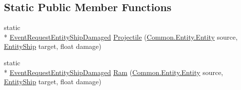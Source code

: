 \subsection*{Static Public Member Functions}
\begin{DoxyCompactItemize}
\item 
static \\*
\hyperlink{class_skyrates_1_1_client_1_1_network_1_1_event_1_1_event_request_entity_ship_damaged}{Event\-Request\-Entity\-Ship\-Damaged} \hyperlink{class_skyrates_1_1_client_1_1_network_1_1_event_1_1_event_request_entity_ship_damaged_a2349e761091c78c246224a5b129cb69c}{Projectile} (\hyperlink{class_skyrates_1_1_common_1_1_entity_1_1_entity}{Common.\-Entity.\-Entity} source, \hyperlink{class_skyrates_1_1_client_1_1_entity_1_1_entity_ship}{Entity\-Ship} target, float damage)
\item 
static \\*
\hyperlink{class_skyrates_1_1_client_1_1_network_1_1_event_1_1_event_request_entity_ship_damaged}{Event\-Request\-Entity\-Ship\-Damaged} \hyperlink{class_skyrates_1_1_client_1_1_network_1_1_event_1_1_event_request_entity_ship_damaged_abf0a860dbfeaf12e4f2165f4def0e438}{Ram} (\hyperlink{class_skyrates_1_1_common_1_1_entity_1_1_entity}{Common.\-Entity.\-Entity} source, \hyperlink{class_skyrates_1_1_client_1_1_entity_1_1_entity_ship}{Entity\-Ship} target, float damage)
\end{DoxyCompactItemize}

